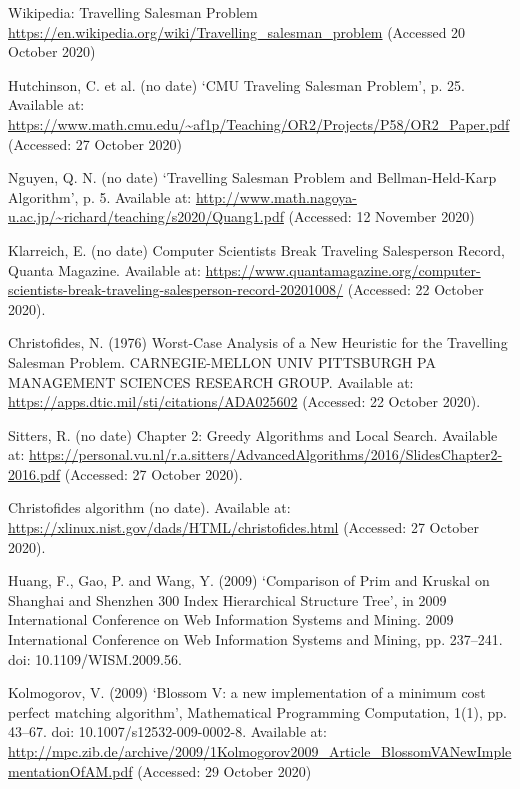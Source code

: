 \documentclass[11pt,a4paper,titlepage]{article}
\begin{document}
\begin{thebibliography}{1}

Wikipedia: Travelling Salesman Problem
\\\url{https://en.wikipedia.org/wiki/Travelling_salesman_problem} (Accessed 20 October 2020)

Hutchinson, C. et al. (no date) ‘CMU Traveling Salesman Problem’, p. 25. Available at: \url{https://www.math.cmu.edu/~af1p/Teaching/OR2/Projects/P58/OR2_Paper.pdf} (Accessed: 27 October 2020)

Nguyen, Q. N. (no date) ‘Travelling Salesman Problem and Bellman-Held-Karp Algorithm’, p. 5. Available at: \url{http://www.math.nagoya-u.ac.jp/~richard/teaching/s2020/Quang1.pdf} (Accessed: 12 November 2020)

Klarreich, E. (no date) Computer Scientists Break Traveling Salesperson Record, Quanta Magazine. Available at: \url{https://www.quantamagazine.org/computer-scientists-break-traveling-salesperson-record-20201008/} (Accessed: 22 October 2020).

Christofides, N. (1976) Worst-Case Analysis of a New Heuristic for the Travelling Salesman Problem. CARNEGIE-MELLON UNIV PITTSBURGH PA MANAGEMENT SCIENCES RESEARCH GROUP. Available at: \url{https://apps.dtic.mil/sti/citations/ADA025602} (Accessed: 22 October 2020).

Sitters, R. (no date) Chapter 2: Greedy Algorithms and Local Search. Available at: \url{https://personal.vu.nl/r.a.sitters/AdvancedAlgorithms/2016/SlidesChapter2-2016.pdf} (Accessed: 27 October 2020).

Christofides algorithm (no date). Available at: \url{https://xlinux.nist.gov/dads/HTML/christofides.html} (Accessed: 27 October 2020).

Huang, F., Gao, P. and Wang, Y. (2009) ‘Comparison of Prim and Kruskal on Shanghai and Shenzhen 300 Index Hierarchical Structure Tree’, in 2009 International Conference on Web Information Systems and Mining. 2009 International Conference on Web Information Systems and Mining, pp. 237–241. doi: 10.1109/WISM.2009.56.

Kolmogorov, V. (2009) ‘Blossom V: a new implementation of a minimum cost perfect matching algorithm’, Mathematical Programming Computation, 1(1), pp. 43–67. doi: 10.1007/s12532-009-0002-8.
Available at: \url{http://mpc.zib.de/archive/2009/1Kolmogorov2009_Article_BlossomVANewImplementationOfAM.pdf} (Accessed: 29 October 2020)


\end{thebibliography}
\end{document}
